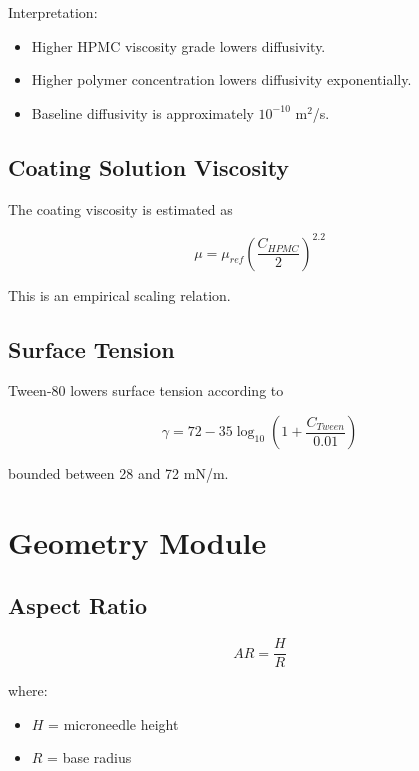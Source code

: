 \documentclass[11pt]{article}
\begin{document}
Interpretation:

\begin{itemize}
\item Higher HPMC viscosity grade lowers diffusivity.
\item Higher polymer concentration lowers diffusivity exponentially.
\item Baseline diffusivity is approximately $10^{-10}$ m$^2$/s.
\end{itemize}

\subsection{Coating Solution Viscosity}

The coating viscosity is estimated as

\begin{equation}
\mu =
\mu_{ref}
\left(
\frac{C_{HPMC}}{2}
\right)^{2.2}
\end{equation}

This is an empirical scaling relation.

\subsection{Surface Tension}

Tween-80 lowers surface tension according to

\begin{equation}
\gamma =
72 - 35 \log_{10}
\left(
1+\frac{C_{Tween}}{0.01}
\right)
\end{equation}

bounded between 28 and 72 mN/m.

\section{Geometry Module}

\subsection{Aspect Ratio}

\begin{equation}
AR = \frac{H}{R}
\end{equation}

where:

\begin{itemize}
\item $H$ = microneedle height
\item $R$ = base radius
\end{itemize}
\end{document}
